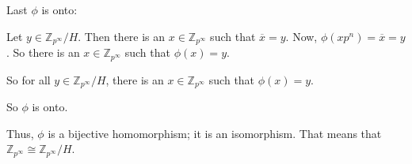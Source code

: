 \documentclass[a4paper,12pt]{article}
\newcommand{\tab}{\hspace{4mm}} %
\newcommand{\Z}{\mathbb{Z}}
\begin{document}
Last $\phi$ is onto:

\tab Let $y \in \Z_{p^\infty}/H$. Then there is an $x \in \Z_{p^\infty}$ such that $\overline{x} = y$. Now, $\phi(xp^n) = \overline{x} = y$. So there is an $x \in \Z_{p^\infty}$ such that $\phi(x)=y$.

\tab So for all $y \in \Z_{p^\infty}/H$, there is an $x \in \Z_{p^\infty}$ such that $\phi(x)=y$.

\tab So $\phi$ is onto.

Thus, $\phi$ is a bijective homomorphism; it is an isomorphism. That means that $\Z_{p^\infty} \cong \Z_{p^\infty}/H$.
\end{document}
